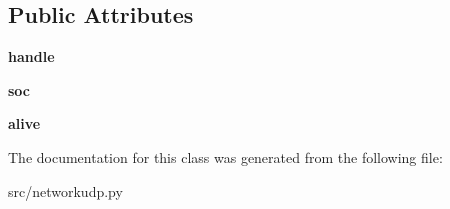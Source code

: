 \subsection*{\-Public \-Attributes}
\begin{DoxyCompactItemize}
\item 
\hypertarget{classsrc_1_1networkudp_1_1_network_client_a61dbbfabbc903c79d6536f304d9c4cac}{{\bfseries handle}}\label{classsrc_1_1networkudp_1_1_network_client_a61dbbfabbc903c79d6536f304d9c4cac}

\item 
\hypertarget{classsrc_1_1networkudp_1_1_network_client_ab8e6fc83d49f30fbd0f567b035e70738}{{\bfseries soc}}\label{classsrc_1_1networkudp_1_1_network_client_ab8e6fc83d49f30fbd0f567b035e70738}

\item 
\hypertarget{classsrc_1_1networkudp_1_1_network_client_adde544c57993b153c6294cbae4a57179}{{\bfseries alive}}\label{classsrc_1_1networkudp_1_1_network_client_adde544c57993b153c6294cbae4a57179}

\end{DoxyCompactItemize}


\-The documentation for this class was generated from the following file\-:\begin{DoxyCompactItemize}
\item 
src/networkudp.\-py\end{DoxyCompactItemize}
